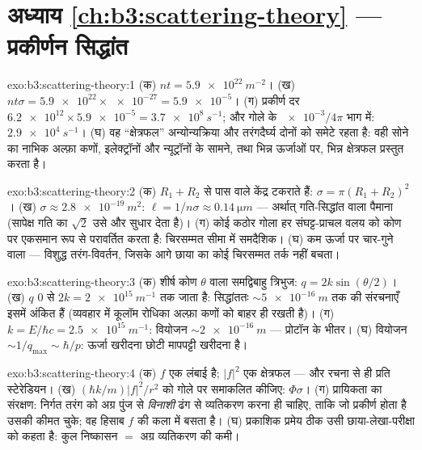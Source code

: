 \section*{अध्याय \ref{ch:b3:scattering-theory} --- प्रकीर्णन सिद्धांत}

\begin{solution}{exo:b3:scattering-theory:1}
(क) $nt = \qty{5.9e22}{m^{-2}}$। (ख) $nt\sigma = \num{5.9e22}
\times \num{e-27} = \num{5.9e-5}$। (ग) प्रकीर्ण दर
$\num{6.2e12} \times \num{5.9e-5} = \qty{3.7e8}{s^{-1}}$; और गोले के
$\num{e-3}/4\pi$ भाग में: $\qty{2.9e4}{s^{-1}}$। (घ) वह
``क्षेत्रफल'' अन्योन्यक्रिया और तरंगदैर्घ्य दोनों को समेटे रहता है:
वही सोने का नाभिक अल्फ़ा कणों, इलेक्ट्रॉनों और न्यूट्रॉनों के सामने,
तथा भिन्न ऊर्जाओं पर, भिन्न क्षेत्रफल प्रस्तुत करता है।
\end{solution}

\begin{solution}{exo:b3:scattering-theory:2}
(क) $R_1 + R_2$ से पास वाले केंद्र टकराते हैं: $\sigma = \pi(R_1 +
R_2)^2$। (ख) $\sigma \approx \qty{2.8e-19}{m^2}$: $\ell = 1/n\sigma
\approx \qty{0.14}{\micro m}$ --- अर्थात् गति-सिद्धांत वाला पैमाना
(सापेक्ष गति का $\sqrt2$ उसे और सुधार देता है)। (ग) कोई कठोर गोला
हर संघट्ट-प्राचल वलय को कोण पर एकसमान रूप से परावर्तित करता है:
चिरसम्मत सीमा में समदैशिक। (घ) कम ऊर्जा पर चार-गुने वाला
 --- विशुद्ध तरंग-विवर्तन, जिसके आगे छाया का कोई
चिरसम्मत तर्क नहीं बचता।
\end{solution}

\begin{solution}{exo:b3:scattering-theory:3}
(क) शीर्ष कोण $\theta$ वाला समद्विबाहु त्रिभुज: $q =
2k\sin(\theta/2)$। (ख) $q$ $0$ से $2k = \qty{2e15}{
m^{-1}}$ तक जाता है: सिद्धांततः $\sim\qty{5e-16}{m}$ तक की संरचनाएँ
इसमें अंकित हैं (व्यवहार में कूलॉम रोधिका अल्फ़ा कणों को
बाहर ही रखती है)। (ग) $k = E/\hbar c = \qty{2.5e15}{m^{-1}}$: वियोजन
$\sim\qty{2e-16}{m}$ --- प्रोटॉन के भीतर। (घ) वियोजन
$\sim 1/q_{\max} \sim \hbar/p$: ऊर्जा खरीदना छोटी मापपट्टी खरीदना
है।
\end{solution}

\begin{solution}{exo:b3:scattering-theory:4}
(क) $f$ एक लंबाई है; $|f|^2$ एक क्षेत्रफल --- और रचना से ही प्रति
स्टेरेडियन। (ख) $(\hbar k/m)|f|^2/r^2$ को गोले पर
समाकलित कीजिए: $\Phi\sigma$। (ग) प्रायिकता का संरक्षण: निर्गत
तरंग को अग्र पुंज से \emph{विनाशी} ढंग से व्यतिकरण करना ही चाहिए,
ताकि जो प्रकीर्ण होता है उसकी कीमत चुके; वह हिसाब $f$ की कला में
बसता है। (घ)
प्रकाशिक प्रमेय ठीक उसी छाया-लेखा-परीक्षा को कहता है: कुल
निष्कासन $=$ अग्र व्यतिकरण की कमी।
\end{solution}

